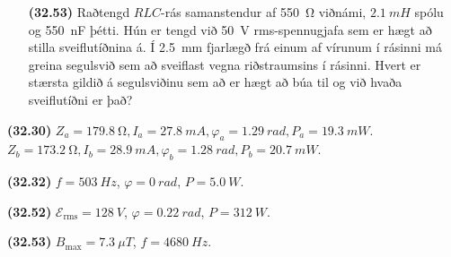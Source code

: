 \ifdefined \wholebook \else\documentclass[oneside]{book}\usepackage{EdlBook}\graphicspath{{figures/}}
\begin{document}
\begin{enumerate}[label = \textbf{(\alph*)}]
\item[\textbf{(32.53)}] Raðtengd $RLC$-rás samanstendur af \SI{550}{\ohm} viðnámi, $\SI{2.1}{mH}$ spólu og \SI{550}{nF} þétti. Hún er tengd við \SI{50}{V} rms-spennugjafa sem er hægt að stilla sveiflutíðnina á. Í \SI{2.5}{mm} fjarlægð frá einum af vírunum í rásinni má greina segulsvið sem að sveiflast vegna riðstraumsins í rásinni. Hvert er stærsta gildið á segulsviðinu sem að er hægt að búa til og við hvaða sveiflutíðni er það?

\end{enumerate}

\begin{tcolorbox}
\begin{enumerate*}[label = ]
  \item \textbf{(32.30)} $Z_a = \SI{179.8}{\ohm}, I_a = \SI{27.8}{mA}, \varphi_a = \SI{1.29}{rad}, P_a = \SI{19.3}{mW}$. \\  $Z_b =\SI{173.2}{\ohm}, I_b = \SI{28.9}{mA}, \varphi_b = \SI{1.28}{rad}, P_b = \SI{20.7}{mW}$.
  \item \textbf{(32.32)} $f = \SI{503}{Hz}$, $\varphi = \SI{0}{rad}$, $P = \SI{5.0}{W}$.
  \item \textbf{(32.52)} $\mathcal{E}_{\text{rms}} = \SI{128}{V}$, $\varphi = \SI{0.22}{rad}$, $P = \SI{312}{W}$.
  \item \textbf{(32.53)} $B_{\text{max}} = \SI{7.3}{\mu T}$, $f = \SI{4680}{Hz}$.
\end{enumerate*}
\end{tcolorbox}

\newpage

\ifdefined \wholebook \else
 \printindex
\end{document}
